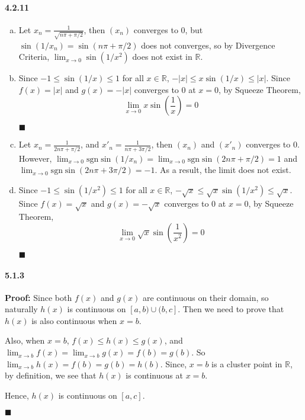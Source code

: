 \documentclass[11pt]{article}
\newcommand{\qed}{
	\begin{flushright}
		$\blacksquare$
	\end{flushright}}
\begin{document}
	\paragraph{4.2.11}
		\begin{enumerate}[(a)]
			\item Let $x_n = \frac{1}{\sqrt{n\pi + \pi/2}}$, then $(x_n)$ converges to $0$, but $\sin(1/x_n) = \sin(n\pi + \pi / 2)$ does not converges, so by Divergence Criteria, $\lim_{x \rightarrow 0}\sin(1/x^2)$ does not exist in $\mathbb{R}$.
			\item Since $-1 \leq \sin(1/x) \leq 1$ for all $x \in \mathbb{R}$, $-|x| \leq x\sin(1/x) \leq |x|$. Since $f(x) = |x|$ and $g(x) = -|x|$ converges to $0$ at $x = 0$, by Squeeze Theorem, 
			\[\lim_{x \rightarrow 0} x\sin(\frac{1}{x}) = 0\]
			\qed
			\item Let $x_n = \frac{1}{2n\pi + \pi/2}$, and $x'_n = \frac{1}{n\pi + 3\pi/2}$, then $(x_n)$ and $(x'_n)$ converges to $0$. However, $\lim_{x \rightarrow 0} \mathrm{sgn}\sin(1/x_n) = \lim_{x \rightarrow 0} \mathrm{sgn}\sin(2n\pi + \pi/2) =  1$ and $\lim_{x \rightarrow 0} \mathrm{sgn}\sin(2n\pi + 3\pi/2) = -1$. As a result, the limit does not exist.
			\item Since $-1 \leq \sin(1/x^2) \leq 1$ for all $x \in \mathbb{R}$, $-\sqrt{x} \leq \sqrt{x}\sin(1/x^2) \leq \sqrt{x}$. Since $f(x) = \sqrt{x}$ and $g(x) = -\sqrt{x}$ converges to $0$ at $x = 0$, by Squeeze Theorem, 
			\[\lim_{x \rightarrow 0} \sqrt{x}\sin(\frac{1}{x^2}) = 0\]
			\qed
		\end{enumerate}
	\paragraph{5.1.3}\textbf{Proof:}
		Since both $f(x)$ and $g(x)$ are continuous on their domain, so naturally $h(x)$ is continuous on $[a, b) \cup (b, c]$. Then we need to prove that $h(x)$ is also continuous when $x = b$.
		
		Also, when $x = b$, $f(x) \leq h(x) \leq g(x)$, and $\lim_{x\rightarrow b}f(x) = \lim_{x\rightarrow b}g(x) = f(b) = g(b)$. So $\lim_{x\rightarrow b}h(x) = f(b) = g(b) = h(b)$. Since, $x = b$ is a cluster point in $\mathbb{R}$, by definition, we see that $h(x)$ is continuous at $x = b$.
		
		Hence, $h(x)$ is continuous on $[a, c]$.
		\qed
\end{document}
